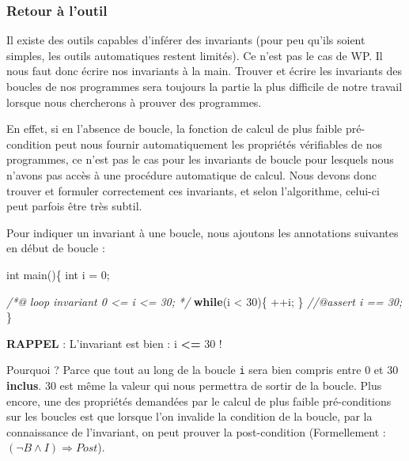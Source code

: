 \documentclass[12pt,francais,]{scrbook}
\newenvironment{Shaded}{}{}
\newcommand{\KeywordTok}[1]{\textcolor[rgb]{0.00,0.44,0.13}{\textbf{{#1}}}}
\newcommand{\DataTypeTok}[1]{\textcolor[rgb]{0.56,0.13,0.00}{{#1}}}
\newcommand{\DecValTok}[1]{\textcolor[rgb]{0.25,0.63,0.44}{{#1}}}
\newcommand{\CommentTok}[1]{\textcolor[rgb]{0.38,0.63,0.69}{\textit{{#1}}}}
\newcommand{\NormalTok}[1]{{#1}}
\newenvironment{zdsalertblock}[1]{%
  \tcolorbox[beamer,%
    noparskip,breakable,
    colback=LightCoral,colframe=DarkRed,%
    colbacklower=Tomato,%
    title=#1]
}{\endtcolorbox}
\begin{document}
\subsubsection{Retour à l'outil}\label{retour-uxe0-loutil}

Il existe des outils capables d'inférer des invariants (pour peu qu'ils
soient simples, les outils automatiques restent limités). Ce n'est pas
le cas de WP. Il nous faut donc écrire nos invariants à la main. Trouver
et écrire les invariants des boucles de nos programmes sera toujours la
partie la plus difficile de notre travail lorsque nous chercherons à
prouver des programmes.

En effet, si en l'absence de boucle, la fonction de calcul de plus
faible pré-condition peut nous fournir automatiquement les propriétés
vérifiables de nos programmes, ce n'est pas le cas pour les invariants
de boucle pour lesquels nous n'avons pas accès à une procédure
automatique de calcul. Nous devons donc trouver et formuler correctement
ces invariants, et selon l'algorithme, celui-ci peut parfois être très
subtil.

Pour indiquer un invariant à une boucle, nous ajoutons les annotations
suivantes en début de boucle :

\begin{footnotesize}\begin{Shaded}
\begin{Highlighting}[]
\DataTypeTok{int} \NormalTok{main()\{}
  \DataTypeTok{int} \NormalTok{i = }\DecValTok{0}\NormalTok{;}
  
  \CommentTok{/*@}
\CommentTok{    loop invariant 0 <= i <= 30;}
\CommentTok{  */}
  \KeywordTok{while}\NormalTok{(i < }\DecValTok{30}\NormalTok{)\{}
    \NormalTok{++i;}
  \NormalTok{\}}
  \CommentTok{//@assert i == 30;}
\NormalTok{\}}
\end{Highlighting}
\end{Shaded}\end{footnotesize}

\begin{zdsalertblock}{Attention}
  \textbf{RAPPEL} : L'invariant est bien : i \textbf{\textless{}=} 30 !
\end{zdsalertblock}

Pourquoi ? Parce que tout au long de la boucle \texttt{i} sera bien
compris entre 0 et 30 \textbf{inclus}. 30 est même la valeur qui nous
permettra de sortir de la boucle. Plus encore, une des propriétés
demandées par le calcul de plus faible pré-conditions sur les boucles
est que lorsque l'on invalide la condition de la boucle, par la
connaissance de l'invariant, on peut prouver la post-condition
(Formellement : \((\neg B \wedge I) \Rightarrow Post\)).
\end{document}
